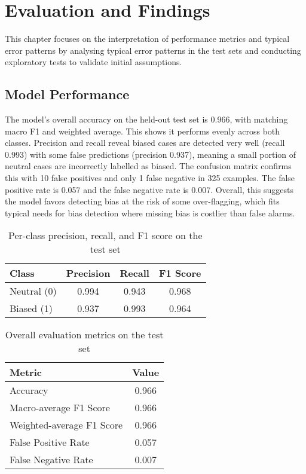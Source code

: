 \chapter{Evaluation and Findings}
    This chapter focuses on the interpretation of performance metrics and typical error patterns by analysing typical error patterns in the test sets and conducting exploratory tests to validate initial assumptions.

\section{Model Performance}
    The model's overall accuracy on the held-out test set is 0.966, with matching macro F1 and weighted average. This shows it performs evenly across both classes. Precision and recall reveal biased cases are detected very well (recall 0.993) with some false predictions (precision 0.937), meaning a small portion of neutral cases are incorrectly labelled as biased. The confusion matrix confirms this with 10 false positives and only 1 false negative in 325 examples. The false positive rate is 0.057 and the false negative rate is 0.007. Overall, this suggests the model favors detecting bias at the risk of some over-flagging, which fits typical needs for bias detection where missing bias is costlier than false alarms.

        \vspace{0.8em}
        \begin{table}[H]
            \centering
            \begin{tabular}{lccc}
            \toprule
            \textbf{Class} & \textbf{Precision} & \textbf{Recall} & \textbf{F1 Score} \\
            \midrule
            Neutral (0) & 0.994 & 0.943 & 0.968 \\
            Biased (1)  & 0.937 & 0.993 & 0.964 \\
            \bottomrule
            \end{tabular}
            \caption{Per-class precision, recall, and F1 score on the test set}
        \end{table}

        \vspace{0.8em}
        \begin{table}[H]
            \centering
            \begin{tabular}{lc}
            \toprule
            \textbf{Metric} & \textbf{Value} \\
            \midrule
            Accuracy & 0.966 \\
            Macro-average F1 Score & 0.966 \\
            Weighted-average F1 Score & 0.966 \\
            False Positive Rate & 0.057 \\
            False Negative Rate & 0.007 \\
            \bottomrule
            \end{tabular}
            \caption{Overall evaluation metrics on the test set}
        \end{table}


